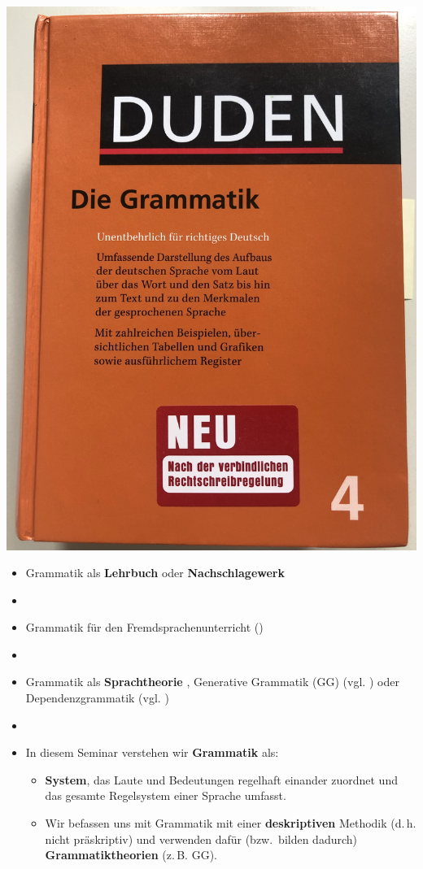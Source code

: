 
\begin{frame}

	\includegraphics[width=.45\textwidth]{material/DudenRichtigesDeutsch}

\end{frame}


\begin{frame}

\begin{itemize}
	\item<1-> Grammatik als \textbf{Lehrbuch} oder \textbf{Nachschlagewerk}
	\item[]
	\item<2-> Grammatik für den Fremdsprachenunterricht (\zB \citealp{Helbig&Buscha05a})
	\item[]
	\item<3-> Grammatik als \textbf{Sprachtheorie} \citep[vgl.][]{MuellerGT-Eng2}, \zB Generative Grammatik (GG) (vgl. \citealp{Philippi&Tewes10a}) oder Dependenzgrammatik (vgl. \citealp{Agel00a})
	\item[]
	\item<4-> In diesem Seminar verstehen wir \textbf{Grammatik} als:

	\begin{itemize}
		\item<4-> \textbf{System}, das Laute und Bedeutungen regelhaft einander zuordnet und das gesamte Regelsystem einer Sprache umfasst.
		\item<4-> Wir befassen uns mit Grammatik mit einer \textbf{deskriptiven} Methodik
                  (d.\,h. nicht präskriptiv) und verwenden dafür (bzw.\ bilden dadurch)
                  \textbf{Grammatiktheorien} (z.\,B. GG).
	\end{itemize}

\end{itemize}

\end{frame}


